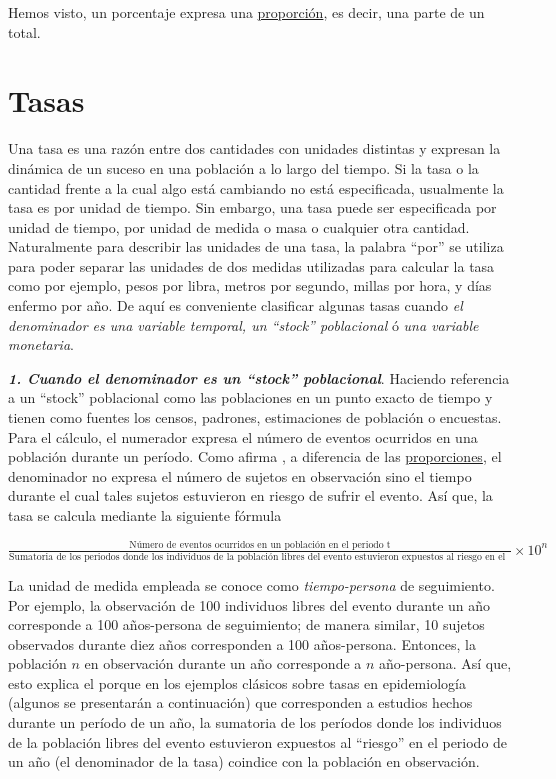 \documentclass[
]{book}
\begin{document}
Hemos visto, un porcentaje expresa una \protect\hyperlink{proporciuxf3n}{proporción}, es decir, una parte de un total.

\hypertarget{tasas}{%
\chapter{Tasas}\label{tasas}}

Una tasa es una razón entre dos cantidades con unidades distintas y expresan la dinámica de un suceso en una población a lo largo del tiempo. Si la tasa o la cantidad frente a la cual algo está cambiando no está especificada, usualmente la tasa es por unidad de tiempo. Sin embargo, una tasa puede ser especificada por unidad de tiempo, por unidad de medida o masa o cualquier otra cantidad. Naturalmente para describir las unidades de una tasa, la palabra ``por'' se utiliza para poder separar las unidades de dos medidas utilizadas para calcular la tasa como por ejemplo, pesos por libra, metros por segundo, millas por hora, y días enfermo por año. De aquí es conveniente clasificar algunas tasas cuando \emph{el denominador es una variable temporal, un ``stock'' poblacional} ó \emph{una variable monetaria}.

\textbf{\emph{1. Cuando el denominador es un ``stock'' poblacional}}. Haciendo referencia a un ``stock'' poblacional como las poblaciones en un punto exacto de tiempo y tienen como fuentes los censos, padrones, estimaciones de población o encuestas. Para el cálculo, el numerador expresa el número de eventos ocurridos en una población durante un período. Como afirma \citet{moreno2000principales}, a diferencia de las \protect\hyperlink{proporcion}{proporciones}, el denominador no expresa el número de sujetos en observación sino el tiempo durante el cual tales sujetos estuvieron en riesgo de sufrir el evento. Así que, la tasa se calcula mediante la siguiente fórmula

\(\frac{\text{Número de eventos ocurridos en un población en el periodo t}}{\text{Sumatoria de los periodos donde los individuos de la población libres del evento estuvieron expuestos al riesgo en el periodo t}}\times 10^n\)

La unidad de medida empleada se conoce como \emph{tiempo-persona} de seguimiento. Por ejemplo, la observación de 100 individuos libres del evento durante un año corresponde a 100 años-persona de seguimiento; de manera similar, 10 sujetos observados durante diez años corresponden a 100 años-persona. Entonces, la población \(n\) en observación durante un año corresponde a \(n\) año-persona. Así que, esto explica el porque en los ejemplos clásicos sobre tasas en epidemiología (algunos se presentarán a continuación) que corresponden a estudios hechos durante un período de un año, la sumatoria de los períodos donde los individuos de la población libres del evento estuvieron expuestos al ``riesgo'' en el periodo de un año (el denominador de la tasa) coindice con la población en observación.
\end{document}
